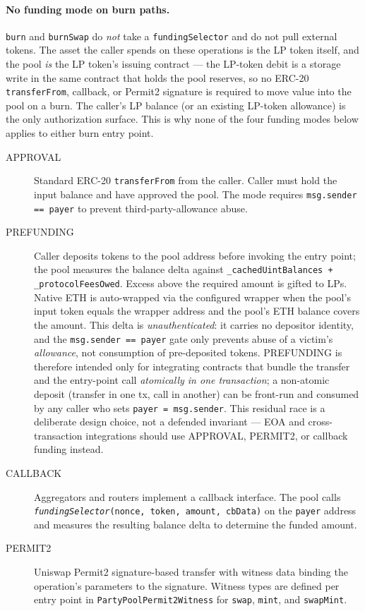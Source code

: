 \documentclass[11pt]{article}
\begin{document}
\paragraph{No funding mode on burn paths.}
\texttt{burn} and \texttt{burnSwap} do \emph{not} take a
\texttt{fundingSelector} and do not pull external tokens. The asset the
caller spends on these operations is the LP token itself, and the pool
\emph{is} the LP token's issuing contract --- the LP-token debit is a
storage write in the same contract that holds the pool reserves, so no
ERC-20 \texttt{transferFrom}, callback, or Permit2 signature is required
to move value into the pool on a burn. The caller's LP balance (or an
existing LP-token allowance) is the only authorization surface. This is
why none of the four funding modes below applies to either burn entry
point.

\begin{description}
  \item[\textsf{APPROVAL}] Standard ERC-20 \texttt{transferFrom} from the
        caller. Caller must hold the input balance and have approved the pool.
        The mode requires \texttt{msg.sender == payer} to prevent
        third-party-allowance abuse.
  \item[\textsf{PREFUNDING}] Caller deposits tokens to the pool address before
        invoking the entry point; the pool measures the balance delta against
        \texttt{\_cachedUintBalances + \_protocolFeesOwed}. Excess above the
        required amount is gifted to LPs. Native ETH is auto-wrapped via the
        configured wrapper when the pool's input token equals the wrapper
        address and the pool's ETH balance covers the amount. This delta is
        \emph{unauthenticated}: it carries no depositor identity, and the
        \texttt{msg.sender == payer} gate only prevents abuse of a victim's
        \emph{allowance}, not consumption of pre-deposited tokens. PREFUNDING is
        therefore intended only for integrating contracts that bundle the
        transfer and the entry-point call \emph{atomically in one transaction};
        a non-atomic deposit (transfer in one tx, call in another) can be
        front-run and consumed by any caller who sets \texttt{payer = msg.sender}.
        This residual race is a deliberate design choice, not a defended
        invariant --- EOA and cross-transaction integrations should use
        \textsf{APPROVAL}, \textsf{PERMIT2}, or callback funding instead.
  \item[\textsf{CALLBACK}] Aggregators and routers implement a callback
        interface. The pool calls
        \texttt{\textit{fundingSelector}(nonce, token, amount, cbData)}
        on the \texttt{payer} address and measures the resulting balance
        delta to determine the funded amount.
  \item[\textsf{PERMIT2}] Uniswap Permit2 signature-based transfer with
        witness data binding the operation's parameters to the signature.
        Witness types are defined per entry point in
        \texttt{PartyPoolPermit2Witness} for \texttt{swap}, \texttt{mint},
        and \texttt{swapMint}.
\end{description}
\end{document}
